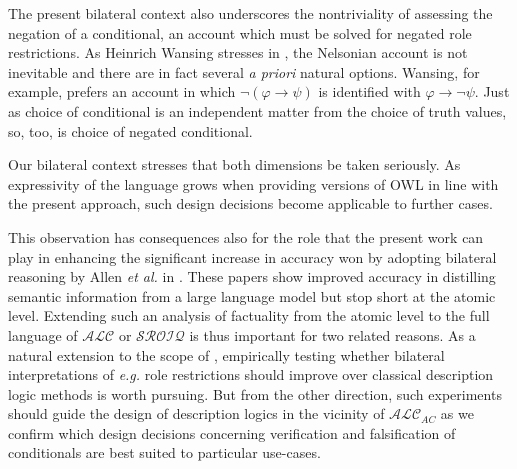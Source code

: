 \documentclass[letterpaper]{article}
\begin{document}
The present bilateral context also underscores the nontriviality of assessing the negation of a conditional, an account which must be solved for negated role restrictions. As Heinrich Wansing stresses in \cite{DBLP:conf/aiml/Wansing10}, the Nelsonian account is not inevitable and there are in fact several \emph{a priori} natural options. Wansing, for example, prefers an account in which $\neg(\varphi\rightarrow\psi)$ is identified with $\varphi\rightarrow\neg\psi$. Just as choice of conditional is an independent matter from the choice of truth values, so, too, is choice of negated conditional. 

Our bilateral context stresses that both dimensions be taken seriously. As expressivity of the language grows when providing versions of OWL in line with the present approach, such design decisions become applicable to further cases. 

This observation has consequences also for the role that the present work can play in enhancing the significant increase in accuracy won by adopting bilateral reasoning by Allen \emph{et al.} in \cite{DBLP:conf/nesy/AllenCFIG25}. These papers show improved accuracy in distilling semantic information from a large language model but stop short at the atomic level. Extending such an analysis of factuality from the atomic level to the full language of $\mathcal{ALC}$ or $\mathcal{SROIQ}$ is thus important for two related reasons. As a natural extension to the scope of \cite{DBLP:conf/nesy/AllenCFIG25}, empirically testing whether bilateral interpretations of \emph{e.g.} role restrictions should improve over classical description logic methods is worth pursuing. But from the other direction, such experiments should guide the design of description logics in the vicinity of $\mathcal{ALC}_{AC}$ as we confirm which design decisions concerning verification and falsification of conditionals are best suited to particular use-cases.



\end{document}
